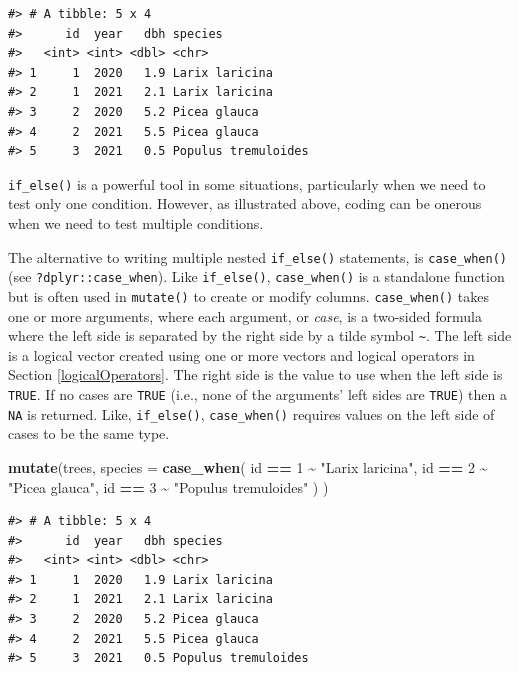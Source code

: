 \documentclass[
  11pt,
]{krantz}
\newenvironment{Shaded}{\begin{snugshade}}{\end{snugshade}}
\newcommand{\DataTypeTok}[1]{\textcolor[rgb]{0.13,0.29,0.53}{#1}}
\newcommand{\DecValTok}[1]{\textcolor[rgb]{0.00,0.00,0.81}{#1}}
\newcommand{\KeywordTok}[1]{\textcolor[rgb]{0.13,0.29,0.53}{\textbf{#1}}}
\newcommand{\NormalTok}[1]{#1}
\newcommand{\OperatorTok}[1]{\textcolor[rgb]{0.81,0.36,0.00}{\textbf{#1}}}
\newcommand{\StringTok}[1]{\textcolor[rgb]{0.31,0.60,0.02}{#1}}
\theoremstyle{definition}
\theoremstyle{definition}
\theoremstyle{definition}
\theoremstyle{definition}
\theoremstyle{remark}
\begin{document}
\begin{verbatim}
#> # A tibble: 5 x 4
#>      id  year   dbh species            
#>   <int> <int> <dbl> <chr>              
#> 1     1  2020   1.9 Larix laricina     
#> 2     1  2021   2.1 Larix laricina     
#> 3     2  2020   5.2 Picea glauca       
#> 4     2  2021   5.5 Picea glauca       
#> 5     3  2021   0.5 Populus tremuloides
\end{verbatim}

\texttt{if\_else()} is a powerful tool in some situations, particularly when we need to test only one condition. However, as illustrated above, coding can be onerous when we need to test multiple conditions.

The alternative to writing multiple nested \texttt{if\_else()} statements, is \texttt{case\_when()} (see \texttt{?dplyr::case\_when}). Like \texttt{if\_else()}, \texttt{case\_when()} is a standalone function but is often used in \texttt{mutate()} to create or modify columns. \texttt{case\_when()} takes one or more arguments, where each argument, or \emph{case}, is a two-sided formula where the left side is separated by the right side by a tilde symbol \texttt{\textasciitilde{}}. The left side is a logical vector created using one or more vectors and logical operators in Section \ref{logicalOperators}. The right side is the value to use when the left side is \texttt{TRUE}. If no cases are \texttt{TRUE} (i.e., none of the arguments' left sides are \texttt{TRUE}) then a \texttt{NA} is returned. Like, \texttt{if\_else()}, \texttt{case\_when()} requires values on the left side of cases to be the same type.

\begin{Shaded}
\begin{Highlighting}[]
\KeywordTok{mutate}\NormalTok{(trees, }\DataTypeTok{species =} \KeywordTok{case\_when}\NormalTok{(}
\NormalTok{                          id }\OperatorTok{==}\StringTok{ }\DecValTok{1} \OperatorTok{\textasciitilde{}}\StringTok{ "Larix laricina"}\NormalTok{,}
\NormalTok{                          id }\OperatorTok{==}\StringTok{ }\DecValTok{2} \OperatorTok{\textasciitilde{}}\StringTok{ "Picea glauca"}\NormalTok{,}
\NormalTok{                          id }\OperatorTok{==}\StringTok{ }\DecValTok{3} \OperatorTok{\textasciitilde{}}\StringTok{ "Populus tremuloides"}
\NormalTok{                        )}
\NormalTok{)}
\end{Highlighting}
\end{Shaded}

\begin{verbatim}
#> # A tibble: 5 x 4
#>      id  year   dbh species            
#>   <int> <int> <dbl> <chr>              
#> 1     1  2020   1.9 Larix laricina     
#> 2     1  2021   2.1 Larix laricina     
#> 3     2  2020   5.2 Picea glauca       
#> 4     2  2021   5.5 Picea glauca       
#> 5     3  2021   0.5 Populus tremuloides
\end{verbatim}
\end{document}
